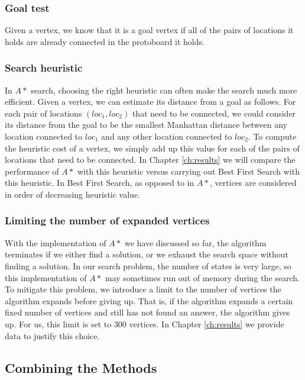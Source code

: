 \subsubsection{Goal test}

Given a vertex, we know that it is a goal vertex if all of the pairs of
locations it holds are already connected in the protoboard it holds.

\subsubsection{Search heuristic}

In $A*$ search, choosing the right heuristic can often make the search much more
efficient. Given a
vertex, we can estimate its distance from a goal as follows. For each pair of
locations $(loc_1, loc_2)$ that need to be connected, we could consider its
distance from the
goal to be the smallest Manhattan distance between any location connected to
$loc_1$ and any other location connected to $loc_2$. To compute the heuristic
cost of a vertex, we simply add up this value for each of the pairs of locations
that need to be connected. In Chapter \ref{ch:results} we will compare the
performance of $A*$ with this heuristic versus carrying out Best First Search
with this heuristic. In Best First Search, as opposed to in $A*$, vertices are
considered in order of decreasing heuristic value.

\subsubsection{Limiting the number of expanded vertices}

With the implementation of $A*$ we have discussed so far, the algorithm
terminates if we either find a solution, or we
exhaust the search space without finding a solution. In our search problem, the
number of states is very large, so this implementation of $A*$ may sometimes
run out
of memory during the search. To mitigate this problem, we introduce a limit to
the number of vertices the algorithm expands before giving up. That is, if the
algorithm expands a certain fixed number of vertices and still has not found an
answer, the algorithm gives up. For us, this limit is set to $300$ vertices.
In Chapter \ref{ch:results} we provide data to justify this choice.

\subsection{Combining the Methods}
\label{sec:combined_alg}


